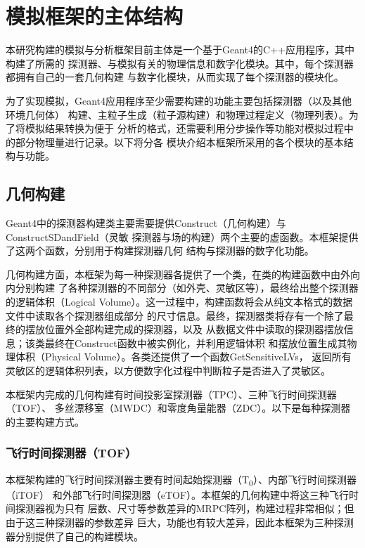 \documentclass[bachelor,openany,oneside,color]{buaathesis}
\def\TZ{T\textsubscript{0}}
\begin{document}

\chapter{模拟框架的主体结构}

本研究构建的模拟与分析框架目前主体是一个基于Geant4的C++应用程序，其中构建了所需的
探测器、与模拟有关的物理信息和数字化模块。其中，每个探测器都拥有自己的一套几何构建
与数字化模块，从而实现了每个探测器的模块化。

为了实现模拟，Geant4应用程序至少需要构建的功能主要包括探测器（以及其他环境几何体）
构建、主粒子生成（粒子源构建）和物理过程定义（物理列表）。为了将模拟结果转换为便于
分析的格式，还需要利用分步操作等功能对模拟过程中的部分物理量进行记录。以下将分各
模块介绍本框架所采用的各个模块的基本结构与功能。

\section{几何构建}

Geant4中的探测器构建类主要需要提供Construct（几何构建）与ConstructSDandField（灵敏
探测器与场的构建）两个主要的虚函数。本框架提供了这两个函数，分别用于构建探测器几何
结构与探测器的数字化功能。

几何构建方面，本框架为每一种探测器各提供了一个类，在类的构建函数中由外向内分别构建
了各种探测器的不同部分（如外壳、灵敏区等），最终给出整个探测器的逻辑体积（Logical
Volume）。这一过程中，构建函数将会从纯文本格式的数据文件中读取各个探测器组成部分
的尺寸信息。最终，探测器类将存有一个除了最终的摆放位置外全部构建完成的探测器，以及
从数据文件中读取的探测器摆放信息；该类最终在Construct函数中被实例化，并利用逻辑体积
和摆放位置生成其物理体积（Physical Volume）。各类还提供了一个函数GetSensitiveLVs，
返回所有灵敏区的逻辑体积列表，以方便数字化过程中判断粒子是否进入了灵敏区。

本框架内完成的几何构建有时间投影室探测器（TPC）、三种飞行时间探测器（TOF）、
多丝漂移室（MWDC）和零度角量能器（ZDC）。以下是每种探测器的主要构建方式。

\subsection{飞行时间探测器（TOF）}\label{ssec:det:tof}

本框架构建的飞行时间探测器主要有时间起始探测器（\TZ）、内部飞行时间探测器（iTOF）
和外部飞行时间探测器（eTOF）。本框架的几何构建中将这三种飞行时间探测器视为只有
层数、尺寸等参数差异的MRPC阵列，构建过程非常相似；但由于这三种探测器的参数差异
巨大，功能也有较大差异，因此本框架为三种探测器分别提供了自己的构建模块。
\end{document}
